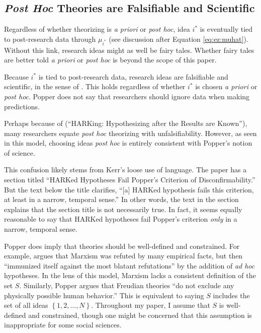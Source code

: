 \documentclass[12pt,english]{article}
\theoremstyle{plain}
\theoremstyle{plain}
\begin{document}
\subsection{\emph{Post Hoc} Theories are Falsifiable and Scientific}

Regardless of whether theorizing is \emph{a priori} or \emph{post hoc}, idea $i^\ast$ is eventually tied to post-research data through $\mu_{i^\ast}$ (see discussion after Equation \eqref{eq:ez:muhat}). Without this link, research ideas might as well be fairy tales. Whether fairy tales are better told \emph{a priori} or \emph{post hoc} is beyond the scope of this paper.

Because $i^\ast$ is tied to post-research data, research ideas are falsifiable and scientific, in the sense of \citet{Popper1959}. This holds regardless of whether $i^\ast$ is chosen \emph{a priori} or \emph{post hoc}. Popper does not say that researchers should ignore data when making predictions.


Perhaps because of \citet{kerr1998harking} (``HARKing: Hypothesizing after the Results are Known''), many researchers equate \emph{post hoc} theorizing with unfalsifiability. However, as seen in this model, choosing ideas \emph{post hoc} is entirely consistent with Popper's notion of science. 

This confusion likely stems from Kerr's loose use of language. The paper has a section titled  ``HARKed Hypotheses Fail Popper's Criterion of Disconfirmability.'' But the text below the title clarifies, ``[a] HARKed hypothesis fails this criterion, at least in a narrow, temporal sense.'' In other words, the text in the section explains that the section title is not necessarily true. In fact, it seems equally reasonable to say that HARKed hypotheses fail Popper's criterion \emph{only} in a narrow, temporal sense. 



Popper does imply that theories should be well-defined and constrained.  For example, \citet{Popper1985} argues that Marxism was refuted by many empirical facts, but then ``immunized itself against the most blatant refutations'' by the addition of \emph{ad hoc} hypotheses. In the lens of this model, Marxism lacks a consistent definition of the set $S$. Similarly, Popper argues that Freudian theories ``do not exclude any physically possible human behavior.'' This is equivalent to saying $S$ includes the set of all ideas $\left\{1,2,...,N\right\}$. Throughout my paper, I assume that $S$ is well-defined and constrained, though one might be concerned that this assumption is inappropriate for some social sciences.
\end{document}
